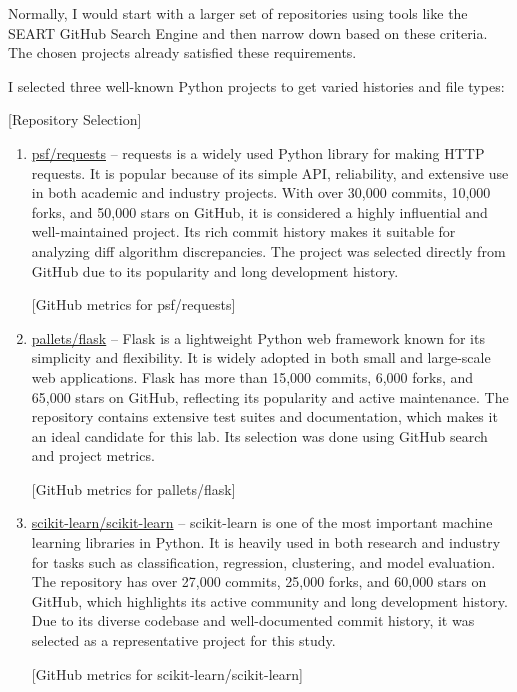 \documentclass[10pt,a4paper]{report}
\begin{document}
Normally, I would start with a larger set of repositories using tools like the SEART GitHub Search Engine and then narrow down based on these criteria. The chosen projects already satisfied these requirements.

I selected three well-known Python projects to get varied histories and file types:

[Repository Selection]

\begin{enumerate}[itemsep=0.2em, topsep=0pt]
    \item \href{https://github.com/psf/requests}{psf/requests} -- requests is a widely used Python library for making HTTP requests. It is popular because of its simple API, reliability, and extensive use in both academic and industry projects. With over 30,000 commits, 10,000 forks, and 50,000 stars on GitHub, it is considered a highly influential and well-maintained project. Its rich commit history makes it suitable for analyzing diff algorithm discrepancies. The project was selected directly from GitHub due to its popularity and long development history.

    [GitHub metrics for psf/requests]

    \item \href{https://github.com/pallets/flask}{pallets/flask} -- Flask is a lightweight Python web framework known for its simplicity and flexibility. It is widely adopted in both small and large-scale web applications. Flask has more than 15,000 commits, 6,000 forks, and 65,000 stars on GitHub, reflecting its popularity and active maintenance. The repository contains extensive test suites and documentation, which makes it an ideal candidate for this lab. Its selection was done using GitHub search and project metrics.

    [GitHub metrics for pallets/flask]

    \item \href{https://github.com/scikit-learn/scikit-learn}{scikit-learn/scikit-learn} -- scikit-learn is one of the most important machine learning libraries in Python. It is heavily used in both research and industry for tasks such as classification, regression, clustering, and model evaluation. The repository has over 27,000 commits, 25,000 forks, and 60,000 stars on GitHub, which highlights its active community and long development history. Due to its diverse codebase and well-documented commit history, it was selected as a representative project for this study.

    [GitHub metrics for scikit-learn/scikit-learn]
\end{enumerate}
\end{document}
